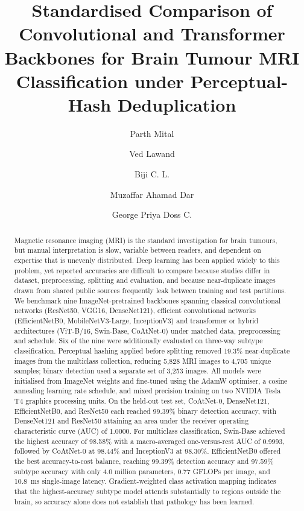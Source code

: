 \documentclass[final,3p,times,number]{elsarticle}
\begin{document}
\begin{frontmatter}

\title{Standardised Comparison of Convolutional and Transformer Backbones for Brain Tumour MRI Classification under Perceptual-Hash Deduplication}

\author[scope]{Parth Mital}
\author[scope]{Ved Lawand}
\author[scope]{Biji C. L.}
\author[sbst]{Muzaffar Ahamad Dar}
\author[sbst]{George Priya Doss C.}


\begin{abstract}
Magnetic resonance imaging (MRI) is the standard investigation for brain tumours, but manual interpretation is slow, variable between readers, and dependent on expertise that is unevenly distributed. Deep learning has been applied widely to this problem, yet reported accuracies are difficult to compare because studies differ in dataset, preprocessing, splitting and evaluation, and because near-duplicate images drawn from shared public sources frequently leak between training and test partitions. We benchmark nine ImageNet-pretrained backbones spanning classical convolutional networks (ResNet50, VGG16, DenseNet121), efficient convolutional networks (EfficientNetB0, MobileNetV3-Large, InceptionV3) and transformer or hybrid architectures (ViT-B/16, Swin-Base, CoAtNet-0) under matched data, preprocessing and schedule. Six of the nine were additionally evaluated on three-way subtype classification. Perceptual hashing applied before splitting removed 19.3\% near-duplicate images from the multiclass collection, reducing 5,828 MRI images to 4,705 unique samples; binary detection used a separate set of 3,253 images. All models were initialised from ImageNet weights and fine-tuned using the AdamW optimiser, a cosine annealing learning rate schedule, and mixed precision training on two NVIDIA Tesla T4 graphics processing units. On the held-out test set, CoAtNet-0, DenseNet121, EfficientNetB0, and ResNet50 each reached 99.39\% binary detection accuracy, with DenseNet121 and ResNet50 attaining an area under the receiver operating characteristic curve (AUC) of 1.0000. For multiclass classification, Swin-Base achieved the highest accuracy of 98.58\% with a macro-averaged one-versus-rest AUC of 0.9993, followed by CoAtNet-0 at 98.44\% and InceptionV3 at 98.30\%. EfficientNetB0 offered the best accuracy-to-cost balance, reaching 99.39\% detection accuracy and 97.59\% subtype accuracy with only 4.0 million parameters, 0.77 GFLOPs per image, and 10.8~ms single-image latency. Gradient-weighted class activation mapping indicates that the highest-accuracy subtype model attends substantially to regions outside the brain, so accuracy alone does not establish that pathology has been learned.
\end{abstract}


\end{frontmatter}
\end{document}
